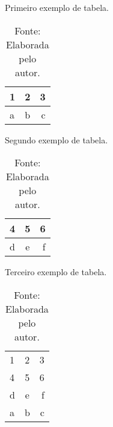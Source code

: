 %
\begin{table}[htbp]
  \centering
  \caption{Primeiro exemplo de tabela.}
  \label{tab:table1}
  \begin{tabular}{l|c||r}
    1 & 2 & 3\\
    \hline
    a & b & c\\
  \end{tabular}
\caption*{Fonte: Elaborada pelo autor.}
\end{table}
%
\begin{table}[htbp]
  \centering
  \caption{Segundo exemplo de tabela.}
  \label{tab:table2}
  \begin{tabular}{l|c||r}
    4 & 5 & 6\\
    \hline
    d & e & f\\
  \end{tabular}
\caption*{Fonte: Elaborada pelo autor.}
\end{table}
%
\begin{table}[htbp]
  \centering
  \caption{Terceiro exemplo de tabela.}
  \label{tab:table3}
  \begin{tabular}{l|c||r}
    1 & 2 & 3\\
    4 & 5 & 6\\
    \hline
    d & e & f\\
    a & b & c\\
  \end{tabular}
\caption*{Fonte: Elaborada pelo autor.}
\end{table}
%
